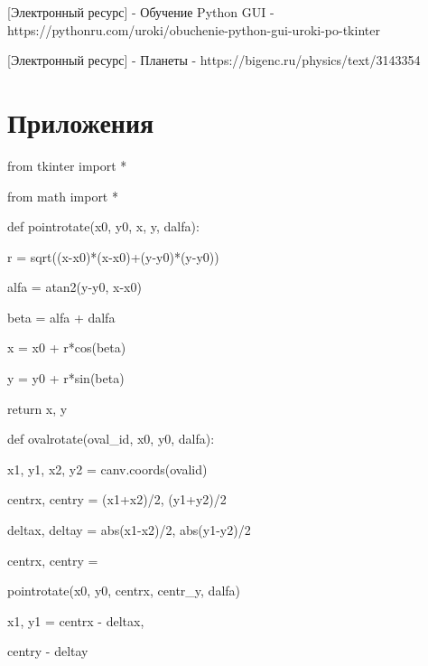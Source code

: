 \documentclass[14pt, oneside]{SavkinSeliverstov}
\begin{document}
[Электронный ресурс] - Обучение Python GUI - https://pythonru.com/uroki/obuchenie-python-gui-uroki-po-tkinter 

[Электронный ресурс] - Планеты - https://bigenc.ru/physics/text/3143354 


\chapter*{Приложения}
from tkinter import *

from math import *


def point\underline{\hspace{0.2cm}}rotate(x0, y0, x, y, dalfa):

	r = sqrt((x-x0)*(x-x0)+(y-y0)*(y-y0))
	
	alfa = atan2(y-y0, x-x0)
	
	beta = alfa + dalfa
	
	x = x0 + r*cos(beta)
	
	y = y0 + r*sin(beta)
	
	return x, y
	


def oval\underline{\hspace{0.2cm}}rotate(oval_id, x0, y0, dalfa):

	x1, y1, x2, y2 = canv.coords(oval\underline{\hspace{0.2cm}}id)
	
	centr\underline{\hspace{0.2cm}}x, centr\underline{\hspace{0.2cm}}y = (x1+x2)/2, (y1+y2)/2
	
	delta\underline{\hspace{0.2cm}}x, delta\underline{\hspace{0.2cm}}y = abs(x1-x2)/2, abs(y1-y2)/2
	
	centr\underline{\hspace{0.2cm}}x, centr\underline{\hspace{0.2cm}}y =
	
	point\underline{\hspace{0.2cm}}rotate(x0, y0, centr\underline{\hspace{0.2cm}}x, centr_y, dalfa)
	
	x1, y1 = centr\underline{\hspace{0.2cm}}x - delta\underline{\hspace{0.2cm}}x,
	
	centr\underline{\hspace{0.2cm}}y - delta\underline{\hspace{0.2cm}}y
\end{document}

